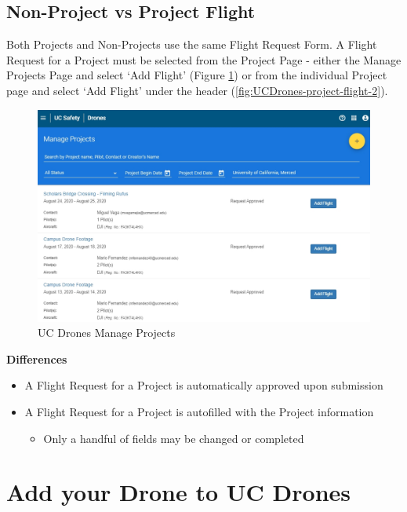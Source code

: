 \documentclass[
  12pt,
]{book}
\providecommand{\tightlist}{%
  \setlength{\itemsep}{0pt}\setlength{\parskip}{0pt}}
\begin{document}
\hypertarget{non-project-vs-project-flight}{%
\subsection{Non-Project vs Project Flight}\label{non-project-vs-project-flight}}

Both Projects and Non-Projects use the same Flight Request Form. A Flight Request for a Project must be selected from the Project Page - either the Manage Projects Page and select `Add Flight' (Figure \ref{fig:UCDrones-project-flight-1}) or from the individual Project page and select `Add Flight' under the header (\ref{fig:UCDrones-project-flight-2}).

\begin{figure}

{\centering \includegraphics[width=0.85\linewidth]{images/UCDrones_manage_project} 

}

\caption{UC Drones Manage Projects}\label{fig:UCDrones-project-flight-1}
\end{figure}

\textbf{Differences}

\begin{itemize}
\tightlist
\item
  A Flight Request for a Project is automatically approved upon submission
\item
  A Flight Request for a Project is autofilled with the Project information

  \begin{itemize}
  \tightlist
  \item
    Only a handful of fields may be changed or completed
  \end{itemize}
\end{itemize}

\hypertarget{UCDrones-drone}{%
\section{Add your Drone to UC Drones}\label{UCDrones-drone}}
\end{document}
